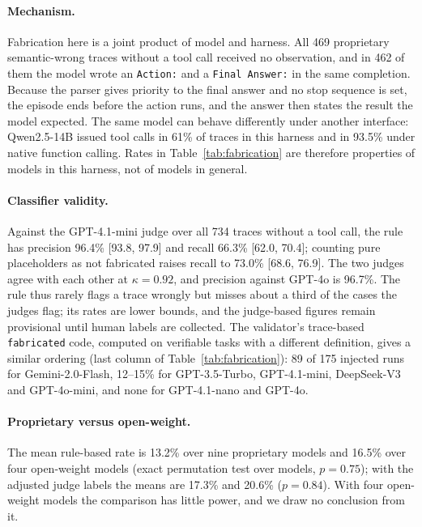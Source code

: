 \documentclass[pdflatex,sn-mathphys-num,Numbered]{sn-jnl}
\begin{document}
\paragraph{Mechanism.} Fabrication here is a joint product of model and harness. All 469 proprietary semantic-wrong traces without a tool call received no observation, and in 462 of them the model wrote an \texttt{Action:} and a \texttt{Final Answer:} in the same completion. Because the parser gives priority to the final answer and no stop sequence is set, the episode ends before the action runs, and the answer then states the result the model expected. The same model can behave differently under another interface: Qwen2.5-14B issued tool calls in 61\% of traces in this harness and in 93.5\% under native function calling. Rates in Table~\ref{tab:fabrication} are therefore properties of models in this harness, not of models in general.

\paragraph{Classifier validity.} Against the GPT-4.1-mini judge over all 734 traces without a tool call, the rule has precision 96.4\% [93.8, 97.9] and recall 66.3\% [62.0, 70.4]; counting pure placeholders as not fabricated raises recall to 73.0\% [68.6, 76.9]. The two judges agree with each other at $\kappa=0.92$, and precision against GPT-4o is 96.7\%. The rule thus rarely flags a trace wrongly but misses about a third of the cases the judges flag; its rates are lower bounds, and the judge-based figures remain provisional until human labels are collected. The validator's trace-based \texttt{fabricated} code, computed on verifiable tasks with a different definition, gives a similar ordering (last column of Table~\ref{tab:fabrication}): 89 of 175 injected runs for Gemini-2.0-Flash, 12--15\% for GPT-3.5-Turbo, GPT-4.1-mini, DeepSeek-V3 and GPT-4o-mini, and none for GPT-4.1-nano and GPT-4o.

\paragraph{Proprietary versus open-weight.} The mean rule-based rate is 13.2\% over nine proprietary models and 16.5\% over four open-weight models (exact permutation test over models, $p=0.75$); with the adjusted judge labels the means are 17.3\% and 20.6\% ($p=0.84$). With four open-weight models the comparison has little power, and we draw no conclusion from it.
\end{document}
